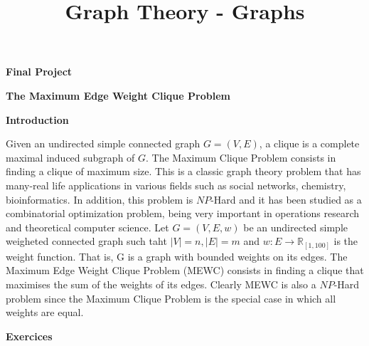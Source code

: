 \documentclass{article}
\begin{document}
\title{Graph Theory - Graphs}

\begin{center}
    {\Huge \bf Final Project}
\end{center}

\begin{center}
    {\LARGE \bf The Maximum Edge Weight Clique Problem}
\end{center}


\begin{flushleft}
    {\LARGE \bf{Introduction}}
\end{flushleft}

\begin{flushleft}

    Given an undirected simple connected graph $G =(V,E)$, a clique is a complete maximal induced subgraph of $G$. The Maximum Clique Problem consists in finding a clique of maximum size. This is a classic graph theory problem that has many-real life applications in various fields such as social networks, chemistry, bioinformatics. In addition, this problem is $NP$-Hard and it has been studied as a combinatorial optimization problem, being very important in operations research and theoretical computer science.
    \newline \newline
    Let $G = (V,E,w)$ be an undirected simple weigheted connected graph such taht $|V| = n, |E|=m$ and $w : E \rightarrow \mathbb{R}_{[1,100]}$ is the weight function. That is, G is a graph with bounded weights on its edges. The Maximum Edge Weight Clique Problem (MEWC) consists in finding a clique that maximises the sum of the weights of its edges. Clearly MEWC is also a $NP$-Hard problem since the Maximum Clique Problem is the special case in which all weights are equal.

\end{flushleft}


\begin{flushleft}
    {\LARGE \bf{Exercices}}
\end{flushleft}
\end{document}

